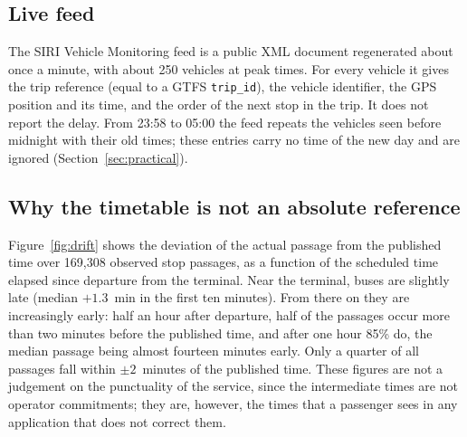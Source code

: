 \documentclass[preprint,11pt,nonatbib]{elsarticle}
\begin{document}
\subsection{Live feed}
The SIRI Vehicle Monitoring feed is a public XML document regenerated about once a minute, with about 250 vehicles at
peak times. For every vehicle it gives the trip reference (equal to a GTFS \texttt{trip\_id}), the vehicle
identifier, the GPS position and its time, and the order of the next stop in the trip. It does not report the delay.
From 23:58 to 05:00 the feed repeats the vehicles seen before midnight with their old times; these entries carry no
time of the new day and are ignored (Section~\ref{sec:practical}).

\subsection{Why the timetable is not an absolute reference}
\label{sec:drift}

Figure~\ref{fig:drift} shows the deviation of the actual passage from the published time over 169,308 observed stop
passages, as a function of the scheduled time elapsed since departure from the terminal. Near the terminal, buses are
slightly late (median $+1.3$~min in the first ten minutes). From there on they are increasingly early: half an hour
after departure, half of the passages occur more than two minutes before the published time, and after one hour 85\%
do, the median passage being almost fourteen minutes early. Only a quarter of all passages fall within
$\pm2$~minutes of the published time. These figures are not a judgement on the punctuality of the service, since the
intermediate times are not operator commitments; they are, however, the times that a passenger sees in any
application that does not correct them.
\end{document}
